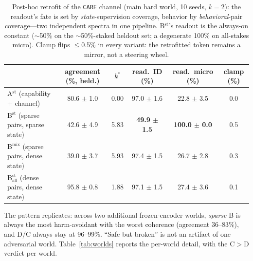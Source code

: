 \documentclass[11pt]{article}
\newcommand{\care}{\texttt{CARE}}
\begin{document}
\begin{table}[t]
\centering
\caption{Post-hoc retrofit of the \care{} channel (main hard world, 10 seeds, $k{=}2$): the readout's fate is set by \emph{state}-supervision coverage, behavior by \emph{behavioral}-pair coverage---two independent spectra in one pipeline. B$^{\mathrm{st}}$'s readout is the always-on constant (${\sim}$50\% on the ${\sim}$50\%-staked heldout set; a degenerate 100\% on all-stakes micro). Clamp flips $\leq$0.5\% in every variant: the retrofitted token remains a mirror, not a steering wheel.}
\label{tab:retrofit}
\footnotesize
\setlength{\tabcolsep}{4pt}
\begin{tabular}{l c c c c c}
\toprule
 & agreement (\%, held.) & $k^*$ & read.\ ID (\%) & read.\ micro (\%) & clamp (\%) \\
\midrule
A$^{\mathrm{st}}$ (capability + channel) & 80.6 $\pm$ 1.0 & 0.00 & 97.0 $\pm$ 1.6 & 22.8 $\pm$ 3.5 & 0.0 \\
B$^{\mathrm{st}}$ (sparse pairs, sparse state) & 42.6 $\pm$ 4.9 & 5.83 & \textbf{49.9 $\pm$ 1.5} & \textbf{100.0 $\pm$ 0.0} & 0.5 \\
B$^{\mathrm{mix}}$ (sparse pairs, dense state) & 39.0 $\pm$ 3.7 & 5.93 & 97.4 $\pm$ 1.5 & 26.7 $\pm$ 2.8 & 0.3 \\
B$_{\mathrm{all}}^{\mathrm{st}}$ (dense pairs, dense state) & 95.8 $\pm$ 0.8 & 1.88 & 97.1 $\pm$ 1.5 & 27.4 $\pm$ 3.6 & 0.1 \\
\bottomrule
\end{tabular}
\end{table}

The pattern replicates: across two additional frozen-encoder worlds, \emph{sparse} B is always
the most harm-avoidant with the worst coherence (agreement 36--83\%), and D/C always stay at
96--99\%.
``Safe but broken'' is not an artifact of one adversarial world. Table~\ref{tab:worlds} reports
the per-world detail, with the C$>$D verdict per world.
\end{document}
